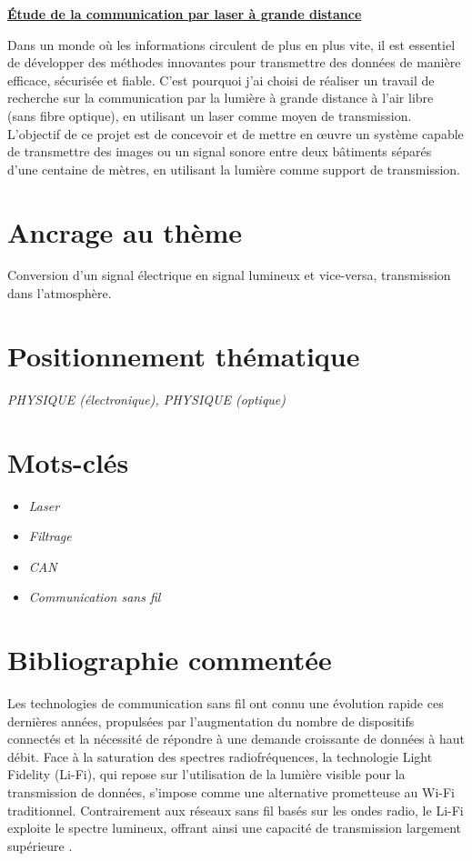 \documentclass[french,titlepage]{extarticle}
\begin{document}
\begin{center}
{\LARGE\textbf{\uline{Étude de la communication par laser à grande
distance}}}{\LARGE\par}
\par\end{center}

Dans un monde où les informations circulent de plus en plus vite,
il est essentiel de développer des méthodes innovantes pour transmettre
des données de manière efficace, sécurisée et fiable. C'est pourquoi
j'ai choisi de réaliser un travail de recherche sur la communication
par la lumière à grande distance à l'air libre (sans fibre optique),
en utilisant un laser comme moyen de transmission. L'objectif de ce
projet est de concevoir et de mettre en œuvre un système capable de
transmettre des images ou un signal sonore entre deux bâtiments séparés
d'une centaine de mètres, en utilisant la lumière comme support de
transmission.

\section*{Ancrage au thème}

Conversion d'un signal électrique en signal lumineux et vice-versa,
transmission dans l'atmosphère.

\section*{Positionnement thématique}

\emph{PHYSIQUE (électronique), PHYSIQUE (optique)}

\section*{Mots-clés}
\begin{itemize}
\item \emph{Laser}
\item \emph{Filtrage}
\item \emph{CAN}
\item \emph{Communication sans fil}
\end{itemize}

\section*{Bibliographie commentée}

Les technologies de communication sans fil ont connu une évolution
rapide ces dernières années, propulsées par l\textquoteright augmentation
du nombre de dispositifs connectés et la nécessité de répondre à une
demande croissante de données à haut débit. Face à la saturation des
spectres radiofréquences, la technologie Light Fidelity (Li-Fi), qui
repose sur l\textquoteright utilisation de la lumière visible pour
la transmission de données, s\textquoteright impose comme une alternative
prometteuse au Wi-Fi traditionnel. Contrairement aux réseaux sans
fil basés sur les ondes radio, le Li-Fi exploite le spectre lumineux,
offrant ainsi une capacité de transmission largement supérieure \cite{key-7}.
\end{document}
